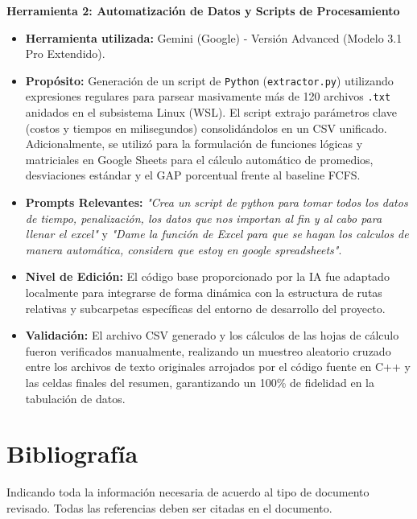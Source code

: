 \documentclass[letter, 10pt]{article}
\begin{document}
\noindent \textbf{Herramienta 2: Automatización de Datos y Scripts de Procesamiento}
\begin{itemize}
    \item \textbf{Herramienta utilizada:} Gemini (Google) - Versi\'on Advanced (Modelo 3.1 Pro Extendido).
    \item \textbf{Propósito:} Generación de un script de \texttt{Python} (\texttt{extractor.py}) utilizando expresiones regulares para parsear masivamente más de 120 archivos \texttt{.txt} anidados en el subsistema Linux (WSL). El script extrajo parámetros clave (costos y tiempos en milisegundos) consolidándolos en un CSV unificado. Adicionalmente, se utilizó para la formulación de funciones lógicas y matriciales en Google Sheets para el cálculo automático de promedios, desviaciones estándar y el GAP porcentual frente al baseline FCFS.
    \item \textbf{Prompts Relevantes:} \textit{"Crea un script de python para tomar todos los datos de tiempo, penalización, los datos que nos importan al fin y al cabo para llenar el excel"} y \textit{"Dame la función de Excel para que se hagan los calculos de manera automática, considera que estoy en google spreadsheets"}.
    \item \textbf{Nivel de Edición:} El código base proporcionado por la IA fue adaptado localmente para integrarse de forma dinámica con la estructura de rutas relativas y subcarpetas específicas del entorno de desarrollo del proyecto.
    \item \textbf{Validación:} El archivo CSV generado y los cálculos de las hojas de cálculo fueron verificados manualmente, realizando un muestreo aleatorio cruzado entre los archivos de texto originales arrojados por el código fuente en C++ y las celdas finales del resumen, garantizando un 100\% de fidelidad en la tabulación de datos.
\end{itemize}

\section{Bibliograf\'ia}
Indicando toda la informaci\'on necesaria de acuerdo al tipo de documento revisado. Todas las referencias deben ser citadas en el documento.



\end{document}
